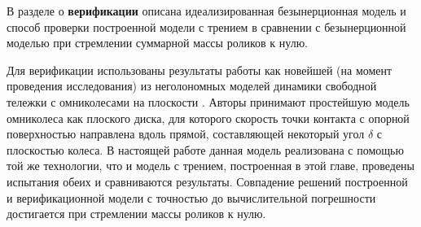 

В разделе о \textbf{верификации} описана идеализированная безынерционная модель и способ проверки построенной модели с трением в сравнении с безынерционной моделью при стремлении суммарной массы роликов к нулю.

Для верификации использованы результаты работы \cite{Borisov2011} как новейшей (на момент проведения исследования) из неголономных моделей динамики свободной тележки с омниколесами на плоскости \cite{Borisov2011, formalskii, ZobovaTatarinovPMM}. Авторы \cite{Borisov2011} принимают простейшую модель омниколеса как плоского диска, для которого скорость точки контакта с опорной поверхностью направлена вдоль прямой, составляющей некоторый угол $\delta$ с плоскостью колеса.
В настоящей работе данная модель реализована с помощью той же технологии, что и модель с трением, построенная в этой главе, проведены испытания обеих и сравниваются результаты.
Совпадение решений построенной и верификационной модели с точностью до вычислительной погрешности достигается при стремлении массы роликов к нулю.

